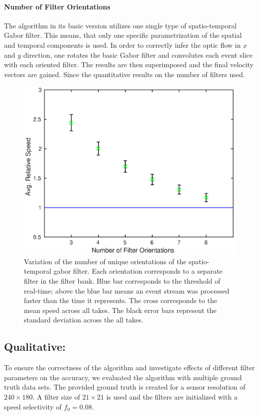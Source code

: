 \paragraph{Number of Filter Orientations}
The algorithm in its basic version utilizes one single type of spatio-temporal Gabor filter.
This means, that only one specific parametrization of the spatial and temporal components is used.
In order to correctly infer the optic flow in $x$ and $y$ direction, one rotates the basic Gabor filter and convolutes each event slice with each oriented filter.
The results are then superimposed and the final velocity vectors are gained.
Since the quantitative results on the number of filters used.
\begin{figure}[!htb]
	\centering
	\includegraphics[scale=.9]{gpu_fo.eps}
	\caption{Variation of the number of unique orientations of the spatio-temporal gabor filter. Each orientation corresponds to a separate filter in the filter bank. Blue bar corresponds to the threshold of real-time; above the blue bar means an event stream was processed faster than the time it represents. The cross corresponds to the mean speed across all takes. The black error bars represent the standard deviation across the all takes.}
	\label{fig:gpu_fo}
\end{figure}

\subsection{Qualitative:} 
To ensure the correctness of the algorithm and investigate effects of different filter parameters on the accuracy, we evaluated the algorithm with multiple ground truth data sets.
The provided ground truth is created for a sensor resolution of $240\times180$.
A filter size of $21\times21$ is used and the filters are initialized with a speed selectivity of $f_0=0.08$.


